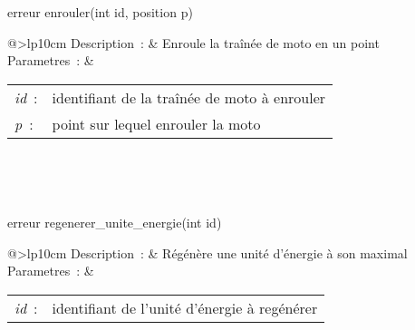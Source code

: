 \begin{minipage}{\linewidth}

\begin{lst-c++}
erreur enrouler(int id, position p)
\end{lst-c++}

\noindent
\begin{tabular}[t]{@{\extracolsep{0pt}}>{\bfseries}lp{10cm}}
Description~: & Enroule la traînée de moto en un point \\


Parametres~: &
\begin{tabular}[t]{@{\extracolsep{0pt}}ll}
    
    
      
        \textsl{id}~: & identifiant de la traînée de moto à enrouler \\
      
    
      
        \textsl{p}~: & point sur lequel enrouler la moto \\
      
    
  \end{tabular} \\






\end{tabular} \\[0.3cm]
\end{minipage}


\begin{minipage}{\linewidth}

\begin{lst-c++}
erreur regenerer_unite_energie(int id)
\end{lst-c++}

\noindent
\begin{tabular}[t]{@{\extracolsep{0pt}}>{\bfseries}lp{10cm}}
Description~: & Régénère une unité d'énergie à son maximal \\


Parametres~: &
\begin{tabular}[t]{@{\extracolsep{0pt}}ll}
    
    
      
        \textsl{id}~: & identifiant de l'unité d'énergie à regénérer \\
      
    
  \end{tabular} \\






\end{tabular} \\[0.3cm]
\end{minipage}


